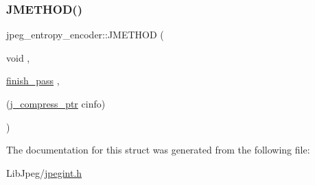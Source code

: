 \mbox{\label{structjpeg__entropy__encoder_a349e641fd2289448e8169b8aa8edefa5}} 
\subsubsection{\texorpdfstring{JMETHOD()}{JMETHOD()}\hspace{0.1cm}{\footnotesize\ttfamily [3/3]}}
{\footnotesize\ttfamily jpeg\+\_\+entropy\+\_\+encoder\+::\+J\+M\+E\+T\+H\+OD (\begin{DoxyParamCaption}\item[{void}]{,  }\item[{\mbox{\hyperlink{jcarith_8c_a3098c13232c4cb8675f1f35a80aa5944}{finish\+\_\+pass}}}]{,  }\item[{(\mbox{\hyperlink{jpeglib_8h_add2a072c54e3a51550f4975f7ddb91e7}{j\+\_\+compress\+\_\+ptr}} cinfo)}]{ }\end{DoxyParamCaption})}



The documentation for this struct was generated from the following file\+:\begin{DoxyCompactItemize}
\item 
Lib\+Jpeg/\mbox{\hyperlink{jpegint_8h}{jpegint.\+h}}\end{DoxyCompactItemize}
